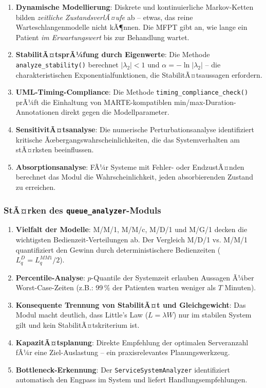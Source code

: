 ﻿\documentclass[a4paper,12pt]{scrreprt}
\theoremstyle{definition}
\begin{document}
\begin{enumerate}
	\item[-] \textbf{Dynamische Modellierung}: Diskrete und kontinuierliche
	Markov-Ketten bilden \emph{zeitliche ZustandsverlÃ¤ufe} ab -- etwas,
	das reine Warteschlangenmodelle nicht kÃ¶nnen. Die MFPT gibt an, wie
	lange ein Patient \emph{im Erwartungswert} bis zur Behandlung wartet.
	\item[-] \textbf{StabilitÃ¤tsprÃ¼fung durch Eigenwerte}: Die Methode
	\texttt{analyze\_stability()} berechnet $|\lambda_2| < 1$ und
	$\alpha = -\ln|\lambda_2|$ -- die charakteristischen Exponentialfunktionen,
	die StabilitÃ¤tsaussagen erfordern.
	\item[-] \textbf{UML-Timing-Compliance}: Die Methode
	\texttt{timing\_compliance\_check()} prÃ¼ft die Einhaltung von
	MARTE-kompatiblen min/max-Duration-Annotationen direkt gegen die
	Modellparameter.
	\item[-] \textbf{SensitivitÃ¤tsanalyse}: Die numerische Perturbationsanalyse
	identifiziert kritische Ãœbergangswahrscheinlichkeiten, die das
	Systemverhalten am stÃ¤rksten beeinflussen.
	\item[-] \textbf{Absorptionsanalyse}: FÃ¼r Systeme mit Fehler- oder
	EndzustÃ¤nden berechnet das Modul die Wahrscheinlichkeit, jeden
	absorbierenden Zustand zu erreichen.
\end{enumerate}

\subsubsection{StÃ¤rken des \texttt{queue\_analyzer}-Moduls}

\begin{enumerate}
	\item[-] \textbf{Vielfalt der Modelle}: M/M/1, M/M/c, M/D/1 und M/G/1
	decken die wichtigsten Bedienzeit-Verteilungen ab. Der Vergleich
	M/D/1 vs. M/M/1 quantifiziert den Gewinn durch deterministischere
	Bedienzeiten ($L_q^D = L_q^{MM1}/2$).
	\item[-] \textbf{Percentile-Analyse}: $p$-Quantile der Systemzeit erlauben
	Aussagen Ã¼ber Worst-Case-Zeiten (z.B.: 99\,\% der Patienten warten
	weniger als $T$ Minuten).
	\item[-] \textbf{Konsequente Trennung von StabilitÃ¤t und Gleichgewicht}:
	Das Modul macht deutlich, dass Little's Law ($L = \lambda W$) nur im
	stabilen System gilt und kein StabilitÃ¤tskriterium ist.
	\item[-] \textbf{KapazitÃ¤tsplanung}: Direkte Empfehlung der optimalen
	Serveranzahl fÃ¼r eine Ziel-Auslastung -- ein praxisrelevantes
	Planungswerkzeug.
	\item[-] \textbf{Bottleneck-Erkennung}: Der \texttt{ServiceSystemAnalyzer}
	identifiziert automatisch den Engpass im System und liefert
	Handlungsempfehlungen.
\end{enumerate}
\end{document}
